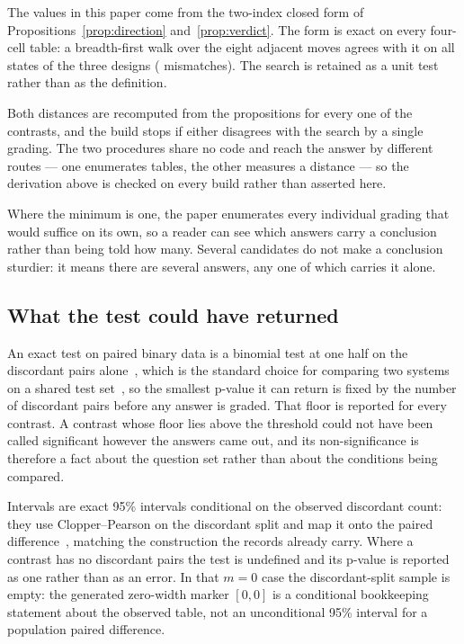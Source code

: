 The values in this paper come from the two-index closed form of
Propositions~\ref{prop:direction} and~\ref{prop:verdict}. The form is exact on
every four-cell table: a breadth-first walk over the eight adjacent moves agrees
with it on all \ClosedFormStates{} states of the three designs
(\ClosedFormMismatches{} mismatches). The search is retained as a unit test
rather than as the definition.

Both distances are recomputed from the propositions for every one of the
\Contrasts{} contrasts, and the build stops if either disagrees with the search
by a single grading. The two procedures share no code and reach the answer by
different routes --- one enumerates tables, the other measures a distance --- so
the derivation above is checked on every build rather than asserted here.

Where the minimum is one, the paper enumerates every individual grading that
would suffice on its own, so a reader can see which answers carry a conclusion
rather than being told how many. Several candidates do not make a conclusion
sturdier: it means there are several answers, any one of which carries it alone.

\subsection{What the test could have returned}

An exact test on paired binary data is a binomial test at one half on the
discordant pairs alone~\cite{mcnemar1947note}, which is the standard choice for
comparing two systems on a shared test set~\cite{dror2018hitchhiker}, so the
smallest p-value it can
return is fixed by the number of discordant pairs before any answer is graded.
That floor is reported for every contrast. A contrast whose floor lies above the
threshold could not have been called significant however the answers came out,
and its non-significance is therefore a fact about the question set rather than
about the conditions being compared.

Intervals are exact 95\% intervals conditional on the observed discordant count:
they use Clopper--Pearson on the discordant split and map it onto the paired
difference~\cite{clopper1934use}, matching the construction the records already
carry. Where a contrast has no discordant pairs the test is undefined and its
p-value is reported as one rather than as an error. In that $m=0$ case the
discordant-split sample is empty: the generated zero-width marker $[0,0]$ is a
conditional bookkeeping statement about the observed table, not an
unconditional 95\% interval for a population paired difference.

